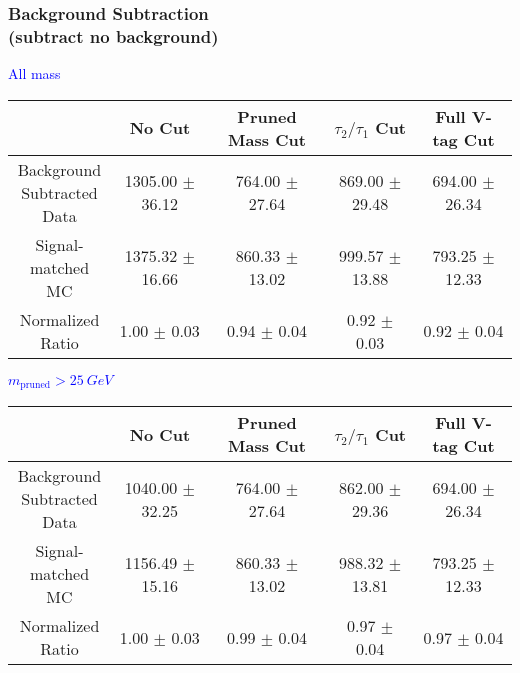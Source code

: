 \documentclass{beamer}
\begin{document}
\begin{frame}
  \frametitle{Background Subtraction \\ (subtract no background)}
  \begin{adjustwidth}{-1.5em}{-1.5em}
    \centering
    \vspace{6pt}
    \textcolor{blue}{All mass}
    \vspace{6pt}

    {\scriptsize
      \begin{tabular}{c | c | c | c | c}
        \hline
        & No Cut & Pruned Mass Cut & $\tau_2/\tau_1$ Cut & Full V-tag Cut \\
        \hline
        \makecell{Background \\ Subtracted \\ Data} & 1305.00 $\pm$ 36.12 & 764.00 $\pm$ 27.64 & 869.00 $\pm$ 29.48 & 694.00 $\pm$ 26.34 \\
        \makecell{Signal-\\ matched MC} & 1375.32 $\pm$ 16.66 & 860.33 $\pm$ 13.02 & 999.57 $\pm$ 13.88 & 793.25 $\pm$ 12.33 \\
        \hline
        \makecell{Normalized \\ Ratio} & 1.00 $\pm$ 0.03 & 0.94 $\pm$ 0.04 & 0.92 $\pm$ 0.03 & 0.92 $\pm$ 0.04 \\
        \hline
      \end{tabular}
    }

    \vspace{6pt}
    \textcolor{blue}{$m_\text{pruned} > \SI{25}{GeV}$}
    \vspace{6pt}

    {\scriptsize
      \begin{tabular}{c | c | c | c | c}
        \hline
        & No Cut & Pruned Mass Cut & $\tau_2/\tau_1$ Cut & Full V-tag Cut \\
        \hline
        \makecell{Background \\ Subtracted \\ Data} & 1040.00 $\pm$ 32.25 & 764.00 $\pm$ 27.64 & 862.00 $\pm$ 29.36 & 694.00 $\pm$ 26.34 \\
        \makecell{Signal-\\ matched MC} & 1156.49 $\pm$ 15.16 & 860.33 $\pm$ 13.02 & 988.32 $\pm$ 13.81 & 793.25 $\pm$ 12.33 \\
        \hline
        \makecell{Normalized \\ Ratio} & 1.00 $\pm$ 0.03 & 0.99 $\pm$ 0.04 & 0.97 $\pm$ 0.04 & 0.97 $\pm$ 0.04 \\
        \hline
      \end{tabular}
    }
  \end{adjustwidth}
\end{frame}
\end{document}
